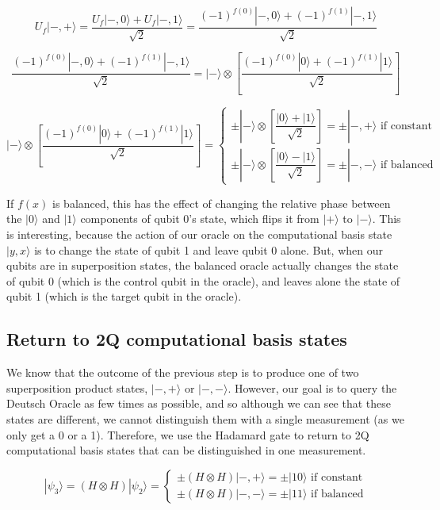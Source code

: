 \documentclass[12pt, letterpaper]{article}
\begin{document}
$$U_f|-, +\rangle = \dfrac{U_f|-, 0\rangle + U_f|-, 1\rangle}{\sqrt{2}} =  \dfrac{(-1)^{f(0)}|-, 0\rangle + (-1)^{f(1)}|-, 1\rangle}{\sqrt{2}}$$
\vspace{1 mm}

$$\dfrac{(-1)^{f(0)}|-, 0\rangle + (-1)^{f(1)}|-, 1\rangle}{\sqrt{2}} = |-\rangle \otimes \left[ \dfrac{(-1)^{f(0)}|0\rangle + (-1)^{f(1)}|1\rangle}{\sqrt{2}}\right]$$

$$|-\rangle \otimes \left[ \dfrac{(-1)^{f(0)}|0\rangle + (-1)^{f(1)}|1\rangle}{\sqrt{2}}\right] =
\begin{cases}
   \pm |-\rangle \otimes \left[ \dfrac{|0\rangle + |1\rangle}{\sqrt{2}}\right] = \pm |-,+\rangle \text{ if constant} \\
   \pm |-\rangle \otimes \left[ \dfrac{|0\rangle - |1\rangle}{\sqrt{2}}\right] = \pm |-,-\rangle \text{ if balanced}
\end{cases}$$
\vspace{2 mm}

\noindent
If $f(x)$ is balanced, this has the effect of changing the relative phase between the $|0\rangle$ and $|1\rangle$ components of qubit 0's state, which flips it from $|+\rangle$ to $|-\rangle$. This is interesting, because the action of our oracle on the computational basis state $|y,x\rangle$ is to change the state of qubit 1 and leave qubit 0 alone. But, when our qubits are in superposition states, the balanced oracle actually changes the state of qubit 0 (which is the control qubit in the oracle), and leaves alone the state of qubit 1 (which is the target qubit in the oracle).

\subsection{Return to 2Q computational basis states}

We know that the outcome of the previous step is to produce one of two superposition product states, $|-, +\rangle$ or $|-, -\rangle$. However, our goal is to query the Deutsch Oracle as few times as possible, and so although we can see that these states are different, we cannot distinguish them with a single measurement (as we only get a 0 or a 1). Therefore, we use the Hadamard gate to return to 2Q computational basis states that can be distinguished in one measurement.

$$|\psi_3\rangle = (H \otimes H)|\psi_2\rangle =
\begin{cases}
   \pm (H \otimes H)|-, +\rangle = \pm |10\rangle \text{ if constant}\\
   \pm (H \otimes H)|-, -\rangle = \pm |11\rangle \text{ if balanced}
\end{cases}$$
\vspace{2 mm}
\end{document}
